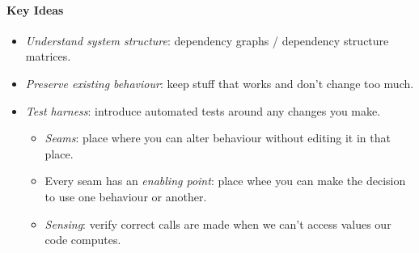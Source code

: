 \documentclass[twocolumn,english]{article}
\begin{document}
\paragraph{Key Ideas}
\begin{itemize}
\item \emph{Understand system structure}: dependency graphs / dependency
structure matrices.
\item \emph{Preserve existing behaviour}: keep stuff that works and don't
change too much.
\item \emph{Test harness}: introduce automated tests around any changes
you make.
\begin{itemize}
\item \emph{Seams}: place where you can alter behaviour without editing
it in that place.
\item Every seam has an \emph{enabling point}: place whee you can make the
decision to use one behaviour or another.
\item \emph{Sensing}: verify correct calls are made when we can't access
values our code computes.
\end{itemize}
\end{itemize}
\end{document}
